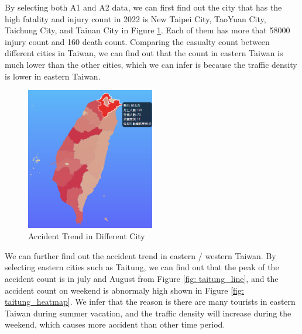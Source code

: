 \documentclass[a4paper, oneside, final, 12pt]{scrartcl} %
\begin{document}
By selecting both A1 and A2 data, we can first find out the city
that has the high fatality and injury count in 2022 is New Taipei City,
TaoYuan City, Taichung City, and Tainan City in Figure \ref{fig: insight_trend_map}.
Each of them has more that 58000 injury count and 160 death count.
Comparing the casualty count between different cities in Taiwan,
we can find out that the count in eastern Taiwan is much lower than the other cities,
which we can infer is because the traffic density is lower in eastern Taiwan.

\begin{figure}[htbp]
  \centering
  \includegraphics[width=0.5\textwidth]{"./Image/insight_trend_map.png"}
  \caption{Accident Trend in Different City}
  \label{fig: insight_trend_map}
\end{figure}

We can further find out the accident trend in eastern / western Taiwan.
By selecting eastern cities such as Taitung, 
we can find out that the peak of the accident count
is in july and August from Figure \ref{fig: taitung_line},
and the accident count on weekend is abnormaly high shown in Figure \ref{fig: taitung_heatmap}.
We infer that the reason is there are many tourists in eastern Taiwan during summer vacation,
and the traffic density will increase during the weekend, 
which causes more accident than other time period.
\end{document}

